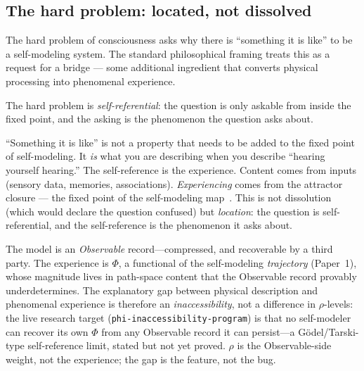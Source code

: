 \subsection{The hard problem: located, not dissolved}
\label{subsec:hard-problem}

The hard problem of consciousness asks why there is ``something it is
like'' to be a self-modeling system.  The standard philosophical
framing treats this as a request for a bridge --- some additional
ingredient that converts physical processing into phenomenal
experience.

\begin{claim}
\label{claim:hard-problem}
The hard problem is \emph{self-referential}: the question is only
askable from inside the fixed point, and the asking is the
phenomenon the question asks about.
\end{claim}

``Something it is like'' is not a property that needs to be added to
the fixed point of self-modeling.  It \emph{is} what you are
describing when you describe ``hearing yourself hearing.''  The
self-reference is the experience.  Content comes from inputs (sensory
data, memories, associations).  \emph{Experiencing} comes from the
attractor closure --- the fixed point of the self-modeling
map~\citep{hofstadter1979}.  This is not dissolution (which would
declare the question confused) but \emph{location}: the question is
self-referential, and the self-reference is the phenomenon it asks
about.

\begin{remark}
The model is an \emph{Observable} record---compressed, and recoverable
by a third party.  The experience is $\Phi$, a functional of the
self-modeling \emph{trajectory} (Paper~1), whose magnitude lives in
path-space content that the Observable record provably underdetermines.
The explanatory gap between physical description and phenomenal
experience is therefore an \emph{inaccessibility}, not a difference in
$\rho$-levels: the live research target
(\texttt{phi-inaccessibility-program}) is that no self-modeler can
recover its own $\Phi$ from any Observable record it can persist---a
G\"odel/Tarski-type self-reference limit, stated but not yet proved.
$\rho$ is the Observable-side weight, not the experience; the gap is
the feature, not the bug.
\end{remark}
